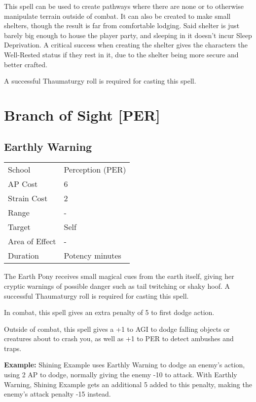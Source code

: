 \documentclass[11pt,a4paper,twocolumn]{book}
\begin{document}
This spell can be used to create pathways where there are none or to otherwise manipulate terrain outside of combat.
It can also be created to make small shelters, though the result is far from comfortable lodging. Said shelter is just barely big enough to house the player party, and sleeping in it doesn't incur Sleep Deprivation. A critical success when creating the shelter gives the characters the Well-Rested status if they rest in it, due to the shelter being more secure and better crafted.

A successful Thaumaturgy roll is required for casting this spell.

\vfill


\section*{Branch of Sight [PER]}
\subsection*{Earthly Warning}
{
	\begin{tabu} to 75mm{| X[l,4] | X[l,7] |}
		\hline
		School 			& Perception (PER)	\\
		AP Cost	      	& 6 				\\
		Strain Cost     & 2 				\\
		Range     		& - 				\\
		Target      	& Self 				\\
		Area of Effect  & - 	 			\\
		Duration     	& Potency minutes 	\\ \hline
	\end{tabu}
	
}

\medskip

The Earth Pony receives small magical cues from the earth itself, giving her cryptic warnings of possible danger such as tail twitching or shaky hoof. A successful Thaumaturgy roll is required for casting this spell.

In combat, this spell gives an extra penalty of 5 to first dodge action.

Outside of combat, this spell gives a +1 to AGI to dodge falling objects or creatures about to crash you, as well as +1 to PER to detect ambushes and traps.

\textbf{Example:} Shining Example uses Earthly Warning to dodge an enemy's action, using 2 AP to dodge, normally giving the enemy -10 to attack. With Earthly Warning, Shining Example gets an additional 5 added to this penalty, making the enemy's attack penalty -15 instead.
\end{document}
